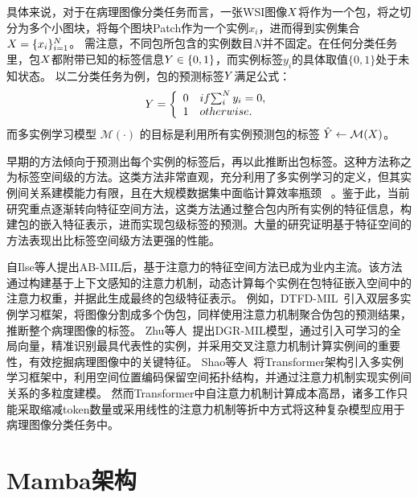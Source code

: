 具体来说，对于在病理图像分类任务而言，一张WSI图像$\mathnormal{X}$将作为一个包，将之切分为多个小图块，将每个图块Patch作为一个实例$x_i$，进而得到实例集合$\mathnormal{X} =\{x_i\}^N_{i=1}$。
需注意，不同包所包含的实例数目$N$并不固定。在任何分类任务里，包$\mathnormal{X}$都附带已知的标签信息$\mathnormal{Y}\in \{0,1\}$，而实例标签$y_i$的具体取值$\{0,1\}$处于未知状态。
以二分类任务为例，包的预测标签\(\mathnormal{Y}\)满足公式：
\begin{equation}
    \mathnormal{Y}=\left \{
    \begin{array}{cl}
        0 &  if \space {\sum_{i}^{N}y_i=0} , \\ 
        1 & otherwise.
    \end{array}\right.
    \label{eq2}
\end{equation} 
而多实例学习模型 $\mathcal{M}(\cdot)$ 的目标是利用所有实例预测包的标签 $\hat{\mathnormal{Y}}\leftarrow\mathcal{M}(\mathnormal{X})$。

早期的方法倾向于预测出每个实例的标签后，再以此推断出包标签。这种方法称之为标签空间级的方法。这类方法非常直观，充分利用了多实例学习的定义，但其实例间关系建模能力有限，且在大规模数据集中面临计算效率瓶颈~\cite{campanella2019clinical} 。鉴于此，当前研究重点逐渐转向特征空间方法，这类方法通过整合包内所有实例的特征信息，构建包的嵌入特征表示，进而实现包级标签的预测。大量的研究证明基于特征空间的方法表现出比标签空间级方法更强的性能。

自Ilse等人\cite{ilse2018attention}提出AB-MIL后，基于注意力的特征空间方法已成为业内主流。该方法通过构建基于上下文感知的注意力机制，动态计算每个实例在包特征嵌入空间中的注意力权重，并据此生成最终的包级特征表示。
例如，DTFD-MIL~\cite{zhang2022dtfd}引入双层多实例学习框架，将图像分割成多个伪包，同样使用注意力机制聚合伪包的预测结果，推断整个病理图像的标签。
Zhu等人~\cite{zhu2024dgr}提出DGR-MIL模型，通过引入可学习的全局向量，精准识别最具代表性的实例，并采用交叉注意力机制计算实例间的重要性，有效挖掘病理图像中的关键特征。
Shao等人~\cite{shao2021transmil}将Transformer架构引入多实例学习框架中，利用空间位置编码保留空间拓扑结构，并通过注意力机制实现实例间关系的多粒度建模。
然而Transformer中自注意力机制计算成本高昂，诸多工作只能采取缩减token数量或采用线性的注意力机制等折中方式将这种复杂模型应用于病理图像分类任务中\cite{tang2024feature}。


\section[\hspace{-2pt}Mamba架构]{{\heiti{} \hspace{-8pt}Mamba架构}}\label{section2: Mamba架构}

